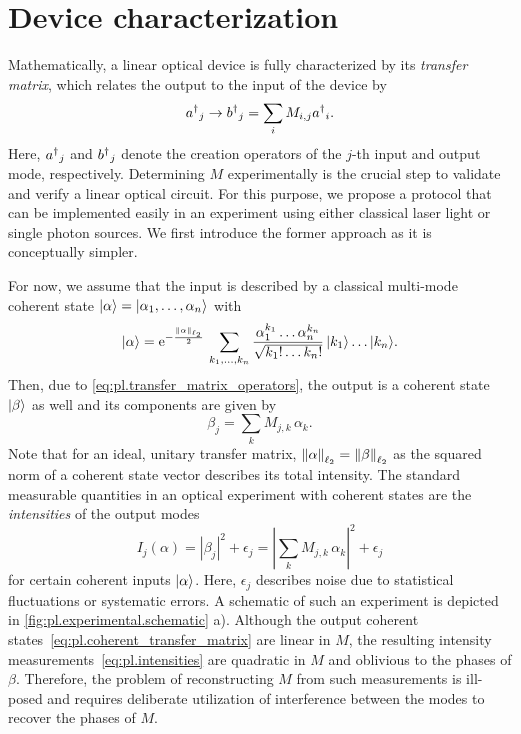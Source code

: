 \section{Device characterization}%
\label{sec:pl.optics}

Mathematically, a linear optical device is fully characterized by its \emph{transfer matrix}, which relates the output to the input of the device by
\[
  \label{eq:pl.transfer_matrix_operators}
  {{a}^\dagger}_j \rightarrow {{b}^\dagger}_j = \sum_i M_{i,j} {{a}^\dagger}_i.
\]
Here, ${{a}^\dagger}_j$ and ${{b}^\dagger}_j$ denote the creation operators of the $j$-th input and output mode, respectively.
Determining ${M}$ experimentally is the crucial step to validate and verify a linear optical circuit.
For this purpose, we propose a protocol that can be implemented easily in an experiment using either classical laser light or single photon sources.
We first introduce the former approach as it is conceptually simpler.

For now, we assume that the input is described by a classical multi-mode coherent state $\ket{{\alpha}} = \ket{\alpha_1, \ldots, \alpha_n}$ with
\[
  \ket{\alpha} = \mathrm{e}^{-\frac{\ltwonorm{\alpha}}{2}} \, \sum_{k_1,\ldots,k_n}  \frac{\alpha_1^{k_1} \ldots \alpha_n^{k_n}}{\sqrt{k_1! \ldots k_n!}} \, \ket{k_1} \ldots \ket{k_n}.
\]
Then, due to \cref{eq:pl.transfer_matrix_operators}, the output is a coherent state $\ket{\beta}$ as well and its components are given by
\[
  \beta_j = \sum_k M_{j,k} \,\alpha_k.
  \label{eq:pl.coherent_transfer_matrix}
\]
Note that for an ideal, unitary transfer matrix, ${\Vert\alpha\Vert}_{\ell_2} = {\Vert\beta\Vert}_{\ell_2}$ as the squared norm of a coherent state vector describes its total intensity.
The standard measurable quantities in an optical experiment with coherent states are the \emph{intensities} of the output modes
\[
  I_j({\alpha})
  = \left| \beta_j \right|^2 + \epsilon_j
  = \left| \sum_k M_{j,k} \, \alpha_k \right|^2 + \epsilon_j
  \label{eq:pl.intensities}
\]
for certain coherent inputs $\ket{{\alpha}}$.
Here, $\epsilon_j$ describes noise due to statistical fluctuations or systematic errors.
A schematic of such an experiment is depicted in \cref{fig:pl.experimental.schematic} a).
Although the output coherent states~\eqref{eq:pl.coherent_transfer_matrix} are linear in ${M}$, the resulting intensity measurements~\eqref{eq:pl.intensities} are quadratic in ${M}$ and oblivious to the phases of $\beta$.
Therefore, the problem of reconstructing ${M}$ from such measurements is ill-posed and requires deliberate utilization of interference between the modes to recover the phases of $M$.

